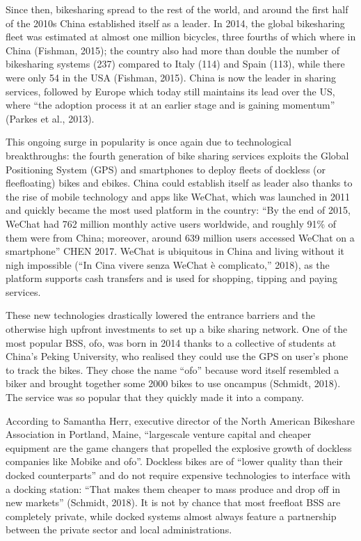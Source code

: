 \documentclass[letterpaper,10pt,english]{jupyterBook}
\begin{document}
\sphinxAtStartPar
Since then, bike\sphinxhyphen{}sharing spread to the rest of the world, and around the first half of the 2010s China established itself as a leader. In 2014, the global bike\sphinxhyphen{}sharing fleet was estimated at almost one million bicycles, three fourths of which where in China (Fishman, 2015); the country also had more than double the number of bike\sphinxhyphen{}sharing systems (237) compared to Italy (114) and Spain (113), while there were only 54 in the USA (Fishman, 2015). China is now the leader in sharing services, followed by Europe \sphinxhyphen{} which today still maintains its lead over the US, where “the adoption process it at an earlier stage and is gaining momentum” (Parkes et al., 2013).

\sphinxAtStartPar
This ongoing surge in popularity is once again due to technological breakthroughs: the fourth generation of bike sharing services exploits the Global Positioning System (GPS) and smartphones to deploy fleets of dock\sphinxhyphen{}less (or flee\sphinxhyphen{}floating) bikes and e\sphinxhyphen{}bikes. China could establish itself as leader also thanks to the rise of mobile technology and apps like WeChat, which was launched in 2011 and quickly became the most used platform in the country: “By the end of 2015, WeChat had 762 million monthly active users worldwide, and roughly 91\% of them were from China; moreover, around 639 million users accessed WeChat on a smartphone” CHEN 2017. WeChat is ubiquitous in China and living without it nigh impossible (“In Cina vivere senza WeChat è complicato,” 2018), as the platform supports cash transfers and is used for shopping, tipping and paying services.

\sphinxAtStartPar
These new technologies drastically lowered the entrance barriers and the otherwise high upfront investments to set up a bike sharing network. One of the most popular BSS, ofo, was born in 2014 thanks to a collective of students at China’s Peking University, who realised they could use the GPS on user’s phone to track the bikes. They chose the name “ofo” because word itself resembled a biker and brought together some 2000 bikes to use on\sphinxhyphen{}campus (Schmidt, 2018). The service was so popular that they quickly made it into a company.

\sphinxAtStartPar
According to Samantha Herr, executive director of the North American Bikeshare Association in Portland, Maine, “large\sphinxhyphen{}scale venture capital and cheaper equipment are the game changers that propelled the explosive growth of dockless companies like Mobike and ofo”. Dockless bikes are of “lower quality than their docked counterparts” and do not require expensive technologies to interface with a docking station: “That makes them cheaper to mass produce and drop off in new markets” (Schmidt, 2018). It is not by chance that most free\sphinxhyphen{}float BSS are completely private, while docked systems almost always feature a partnership between the private sector and local administrations.
\end{document}
